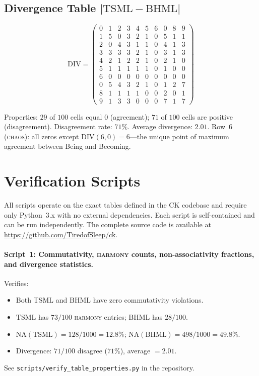 \documentclass[11pt,a4paper]{article}
\theoremstyle{definition}
\theoremstyle{remark}
\newcommand{\NA}{\mathrm{NA}}
\newcommand{\DIV}{\mathrm{DIV}}
\newcommand{\TSML}{\mathrm{TSML}}
\newcommand{\BHML}{\mathrm{BHML}}
\begin{document}
\subsection{Divergence Table $|\TSML-\BHML|$}\label{app:div}

\[
\DIV = \begin{pmatrix}
0 & 1 & 2 & 3 & 4 & 5 & 6 & 0 & 8 & 9\\
1 & 5 & 0 & 3 & 2 & 1 & 0 & 5 & 1 & 1\\
2 & 0 & 4 & 3 & 1 & 1 & 0 & 4 & 1 & 3\\
3 & 3 & 3 & 3 & 2 & 1 & 0 & 3 & 1 & 3\\
4 & 2 & 1 & 2 & 2 & 1 & 0 & 2 & 1 & 0\\
5 & 1 & 1 & 1 & 1 & 1 & 0 & 1 & 0 & 0\\
6 & 0 & 0 & 0 & 0 & 0 & 0 & 0 & 0 & 0\\
0 & 5 & 4 & 3 & 2 & 1 & 0 & 1 & 2 & 7\\
8 & 1 & 1 & 1 & 1 & 0 & 0 & 2 & 0 & 1\\
9 & 1 & 3 & 3 & 0 & 0 & 0 & 7 & 1 & 7
\end{pmatrix}
\]

Properties: $29$ of $100$ cells equal $0$ (agreement); $71$ of $100$ cells are positive (disagreement). Disagreement rate: $71\%$. Average divergence: $2.01$. Row~$6$ (\textsc{chaos}): all zeros except $\DIV(6,0)=6$---the unique point of maximum agreement between Being and Becoming.

\section{Verification Scripts}\label{app:scripts}

All scripts operate on the exact tables defined in the CK codebase and require only Python~3.x with no external dependencies. Each script is self-contained and can be run independently. The complete source code is available at \url{https://github.com/TiredofSleep/ck}.

\paragraph{Script~1: Commutativity, \textsc{harmony} counts, non-associativity fractions, and divergence statistics.}
Verifies:
\begin{itemize}
\item Both $\TSML$ and $\BHML$ have zero commutativity violations.
\item $\TSML$ has $73/100$ \textsc{harmony} entries; $\BHML$ has $28/100$.
\item $\NA(\TSML) = 128/1000 = 12.8\%$; $\NA(\BHML) = 498/1000 = 49.8\%$.
\item Divergence: $71/100$ disagree ($71\%$), average $= 2.01$.
\end{itemize}
See \texttt{scripts/verify\_table\_properties.py} in the repository.
\end{document}
